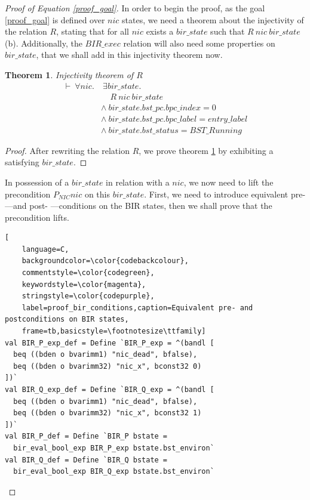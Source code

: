 \documentclass{kththesis}
\newtheorem{theorem}{Theorem}[section]
\begin{document}
\begin{proof}[Proof of Equation \ref{proof_goal}]



In order to begin the proof, as the goal \ref{proof_goal} is defined over $nic$ states, we need a theorem about the injectivity of the relation $R$, stating that for all $nic$ exists a $bir\_state$ such that $R~nic~bir\_state$ (b). Additionally, the $BIR\_exec$ relation will also need some properties on $bir\_state$, that we shall add in this injectivity theorem now.

\begin{theorem} \label{proof_R_inj_thm}
Injectivity theorem of $R$
\begin{equation*} \label{proof_R_inj_thm_eq}
\begin{split}
    \vdash~\forall nic.&~\exists bir\_state.\\
    		&~~~~~R~nic~bir\_state\\
		&\land~bir\_state.bst\_pc.bpc\_index = 0\\
		&\land~bir\_state.bst\_pc.bpc\_label = entry\_label\\
		&\land~bir\_state.bst\_status = BST\_Running
\end{split}
\end{equation*}
\end{theorem}

\begin{proof}
After rewriting the relation $R$, we prove theorem \ref{proof_R_inj_thm} by exhibiting a satisfying $bir\_state$.
\end{proof}

In possession of a $bir\_state$ in relation with a $nic$, we now need to lift the precondition $P_{NIC} nic$ on this $bir\_state$. First, we need to introduce equivalent pre- ---and post- ---conditions on the BIR states, then we shall prove that the precondition lifts.

\begin{lstlisting}[
    language=C,
    backgroundcolor=\color{codebackcolour},
    commentstyle=\color{codegreen},
    keywordstyle=\color{magenta},
    stringstyle=\color{codepurple},
    label=proof_bir_conditions,caption=Equivalent pre- and postconditions on BIR states,
    frame=tb,basicstyle=\footnotesize\ttfamily]
val BIR_P_exp_def = Define `BIR_P_exp = ^(bandl [
  beq ((bden o bvarimm1) "nic_dead", bfalse),
  beq ((bden o bvarimm32) "nic_x", bconst32 0)
])`
val BIR_Q_exp_def = Define `BIR_Q_exp = ^(bandl [
  beq ((bden o bvarimm1) "nic_dead", bfalse),
  beq ((bden o bvarimm32) "nic_x", bconst32 1)
])`
val BIR_P_def = Define `BIR_P bstate =
  bir_eval_bool_exp BIR_P_exp bstate.bst_environ`
val BIR_Q_def = Define `BIR_Q bstate =
  bir_eval_bool_exp BIR_Q_exp bstate.bst_environ`
\end{lstlisting}


\end{proof}
\end{document}
